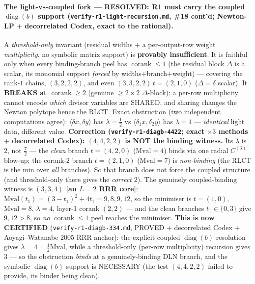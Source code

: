 \documentclass[11pt]{article}
\theoremstyle{plain}
\theoremstyle{definition}
\theoremstyle{remark}
\newcommand{\ideal}[1]{\langle #1 \rangle}
\newcommand{\rlct}{\lambda}          %
\newcommand{\Mval}{\mathrm{Mval}}
\begin{document}
\paragraph{The light-vs-coupled fork --- RESOLVED: R1 must carry the coupled $\operatorname{diag}(b)$
support (\texttt{verify-r1-light-recursion.md}, \#18 cont'd; Newton-LP $+$ decorrelated Codex, exact to
the rational).} A \emph{threshold-only} invariant (residual widths $+$ a per-output-row weight
\emph{multiplicity}, no symbolic matrix support) is \textbf{provably insufficient}. It is faithful only
when every binding-branch peel has $\operatorname{corank}\le1$ (the residual block $\Delta$ is a scalar,
its monomial support \emph{forced} by widths$+$branch$+$weight) --- covering the rank-$1$ chains,
$(3,2,2,2)$, and even $(3,3,2,2)\,t{=}(2,1,0)$ ($\Delta=\delta$ scalar). It \textbf{BREAKS at
$\operatorname{corank}\ge2$} (genuine $\ge2\times2$ $\Delta$-block): a per-row multiplicity cannot encode
\emph{which} divisor variables are SHARED, and sharing changes the Newton polytope hence the RLCT. Exact
obstruction (two independent computations agree): $\ideal{\delta x,\delta y}$ has $\rlct=\tfrac12$ vs
$\ideal{\delta_1 x,\delta_2 y}$ has $\rlct=1$ --- \emph{identical} light data, different value.
\textbf{Correction (\texttt{verify-r1-diagb-4422}; exact $\times3$ methods $+$ decorrelated Codex):
$(4,4,2,2)$ is NOT the binding witness.} Its $\rlct$ is $2$, not $\tfrac72$ --- the \emph{clean} branch
$t{=}(4,2,0)$ ($\Mval{=}4$) binds via one radial $C^{(3)}$ blow-up; the corank-$2$ branch $t{=}(2,1,0)$
($\Mval{=}7$) is \emph{non-binding} (the RLCT is the min over \emph{all} branches). So that branch does
not force the coupled structure (and threshold-only there gives the \emph{correct} $2$). The genuinely
coupled-binding witness is \textbf{$(3,3,4)$ [an $L{=}2$ RRR core]}: $\Mval(t_1)=(3{-}t_1)^2+4t_1=9,8,9,12$,
so the minimiser is $t{=}(1,0)$, $\Mval{=}8$, $\rlct{=}4$, layer-1 corank $(2,2)$ --- and the clean
branches $t_1{\in}\{0,3\}$ give $9,12>8$, so \emph{no} $\operatorname{corank}\le1$ peel reaches the
minimiser. \textbf{This is now CERTIFIED} (\texttt{verify-r1-diagb-334.md}, PROVED $+$ decorrelated Codex
$+$ Aoyagi--Watanabe 2005 RRR anchor): the explicit coupled $\operatorname{diag}(b)$ resolution gives
$\rlct{=}4{=}\tfrac12\Mval$, while a threshold-only (per-row multiplicity) recursion gives $3$ --- so the
obstruction \emph{binds} at a genuinely-binding DLN branch, and the symbolic $\operatorname{diag}(b)$
support is NECESSARY (the test $(4,4,2,2)$ failed to provide, its binder being clean).
\end{document}
